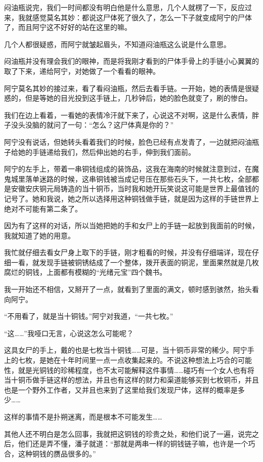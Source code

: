 闷油瓶说完，我们一时间都没有明白他是什么意思，几个人就楞了一下，反应过来，我就感觉莫名其妙：都说这尸体死了很久了，怎么一下子就变成阿宁的尸体了，而且阿宁这不好好的站在这里的嘛。

几个人都很疑惑，而阿宁就皱起眉头，不知道闷油瓶这么说是什么意思。

闷油瓶并没有理会我们的眼神，而是将我刚才看到的尸体手骨上的手链小心翼翼的取了下来，递给阿宁，对她做了一个看看的眼神。

阿宁莫名其妙的接过来，看了看闷油瓶，然后去看手链。一开始，她的表情是很疑惑的，但是等她的目光投到这手链上，几秒钟后，她的脸色就变了，刷的惨白。

我们在边上看着，一看她的表情冷汗就下来了，心说这不对啊，这是什么表情，胖子没头没脑的就问了一句：“怎么？这尸体真是你的？”

阿宁没有说话，但她转头看着我们的时候，脸色已经有点发青了，一边就把闷油瓶子给她的手链递给我们，然后伸出她的右手，伸到我们面前。

阿宁的左手上，带着一串铜钱组成的装饰品，这我在海南的时候就注意到过，在魔鬼城里落单迷路的时候，这串铜钱被当成记号压在那些石头下，一共七枚，全部都是安徽安庆铜元局铸造的当十铜币，当时我和她开玩笑说这可能是世界上最值钱的记号了。她和我说，她之所以选择用这种铜钱做手链，就是因为这样的手链世界上绝对不可能有第二条了。

因为有了这样的对话，所以当她把她的手和女尸上的手链一起放到我面前的时候，我就知道了她的用意。

我忙就仔细去看女尸身上取下的手链，刚才粗看的时候，并没有仔细端详，现在仔细一看，就发现手链被铜锈结成了一个整体，拨开表面的铜泥，里面果然就是几枚腐烂的铜钱，上面都有模糊的“光绪元宝”四个魏书。

我一开始还不相信，又掰开了一点，就看到了里面的满文，顿时感到骇然，抬头看向阿宁。

“不用看了，就是当十铜钱。”阿宁对我道，“一共七枚。”

“这……”我哑口无言，心说这怎么可能呢？

这具女尸的手上，戴的也是七枚当十铜钱……可是，当十铜币非常的稀少。阿宁手上的七枚，是她在十年时间里一点一点收集起来的。不说这种想法上巧合的可能性，就是光铜钱的珍稀程度，也不太可能解释这件事情……碰巧有一个女人也有将当十铜币做手链这样的想法，并且也有这样的财力和渠道能够买到七枚铜币，并且也是一个野外工作者，又并且也来到了这里给我们发现尸体，这样的概率是多少……

这样的事情不是扑朔迷离，而是根本不可能发生……

其他人还不明白是怎么回事，我就把这铜钱的珍贵之处，和他们说了一遍，说完之后，他们还是弄不懂，潘子就道：“那就是两串一样的铜钱链子嘛，也许是一个巧合，这种铜钱的赝品很多的。”

